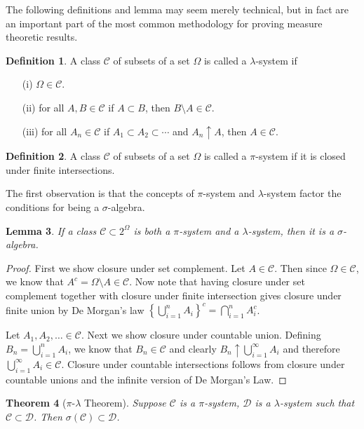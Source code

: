 \documentclass{amsart}
\newtheorem{thm}{Theorem}[section]
\newtheorem{lem}[thm]{Lemma}
\theoremstyle{remark}
\theoremstyle{definition}
\newtheorem{defn}[thm]{Definition}
\begin{document}
The following definitions and lemma may seem merely technical, but in fact are
an important part of the most common methodology for proving measure
theoretic results.  
\begin{defn}A class $\mathcal{C}$ of subsets of a set $\Omega$ is called a $\lambda$-system if
\begin{itemize}
\item[(i)] $\Omega \in \mathcal{C} $.
\item[(ii)] for all $A,B \in \mathcal{C}$ if $A \subset B$, then
  $B \setminus A \in \mathcal{C}$.
\item[(iii)] for all $A_n \in
  \mathcal{C}$ if $A_1 \subset A_2 \subset \cdots$ and $A_n \uparrow A$, then $A \in \mathcal{C}$.
\end{itemize}
\end{defn}
\begin{defn}A class $\mathcal{C}$ of subsets of a set $\Omega$ is
  called a $\pi$-system if it is closed under finite intersections.
\end{defn}
The first observation is that the concepts of $\pi$-system and
$\lambda$-system factor the conditions for being a $\sigma$-algebra.
\begin{lem}\label{PiLambdaSigma}If a class $\mathcal{C} \subset 2^\Omega$ is both a
  $\pi$-system and a $\lambda$-system, then it is a $\sigma$-algebra.
\end{lem}
\begin{proof}
First we show closure under set complement.  Let $A \in \mathcal{C}$.
Then since $\Omega \in \mathcal{C}$, we know that $A^c = \Omega
\setminus A \in \mathcal{C}$.  Now note that having closure under set complement
together with closure under finite intersection gives closure under
finite union by De Morgan's law $\left \{ \bigcup_{i=1}^n A_i \right \} ^
c =  \bigcap_{i=1}^n A_i^c $.

Let $A_1, A_2, \dots \in \mathcal{C}$.  Next we show closure under
countable union.  Defining $B_n = \bigcup_{i=1}^n A_i$, we know that
$B_n \in \mathcal{C}$ and clearly $B_n \uparrow \bigcup_{i=1}^\infty
A_i$ and therefore $\bigcup_{i=1}^\infty A_i \in \mathcal{C}$.
Closure under countable intersections follows from closure under
countable unions and the infinite version of De Morgan's Law.
\end{proof}
\begin{thm}[$\pi$-$\lambda$ Theorem]\label{MonotoneClassTheorem}Suppose $\mathcal{C}$ is a $\pi$-system, $\mathcal{D}$ is a
  $\lambda$-system such that $\mathcal{C} \subset \mathcal{D}$.  Then
  $\sigma(\mathcal{C}) \subset \mathcal{D}$.
\end{thm}
\end{document}
